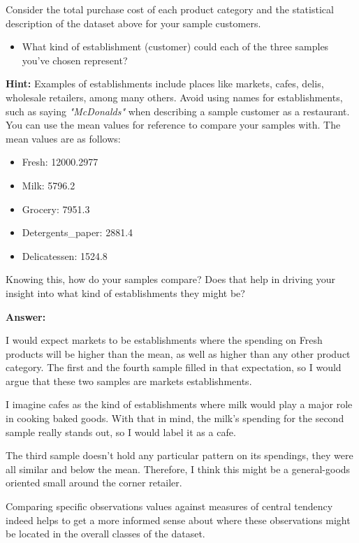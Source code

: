 \documentclass[11pt]{article}
\providecommand{\tightlist}{%
      \setlength{\itemsep}{0pt}\setlength{\parskip}{0pt}}
\begin{document}
Consider the total purchase cost of each product category and the
statistical description of the dataset above for your sample customers.

\begin{itemize}
\tightlist
\item
  What kind of establishment (customer) could each of the three samples
  you've chosen represent?
\end{itemize}

\textbf{Hint:} Examples of establishments include places like markets,
cafes, delis, wholesale retailers, among many others. Avoid using names
for establishments, such as saying \emph{"McDonalds"} when describing a
sample customer as a restaurant. You can use the mean values for
reference to compare your samples with. The mean values are as follows:

\begin{itemize}
\tightlist
\item
  Fresh: 12000.2977
\item
  Milk: 5796.2
\item
  Grocery: 7951.3
\item
  Detergents\_paper: 2881.4
\item
  Delicatessen: 1524.8
\end{itemize}

Knowing this, how do your samples compare? Does that help in driving
your insight into what kind of establishments they might be?

    \textbf{Answer:}

I would expect markets to be establishments where the spending on Fresh
products will be higher than the mean, as well as higher than any other
product category. The first and the fourth sample filled in that
expectation, so I would argue that these two samples are markets
establishments.

I imagine cafes as the kind of establishments where milk would play a
major role in cooking baked goods. With that in mind, the milk's
spending for the second sample really stands out, so I would label it as
a cafe.

The third sample doesn't hold any particular pattern on its spendings,
they were all similar and below the mean. Therefore, I think this might
be a general-goods oriented small around the corner retailer.

Comparing specific observations values against measures of central
tendency indeed helps to get a more informed sense about where these
observations might be located in the overall classes of the dataset.
\end{document}
